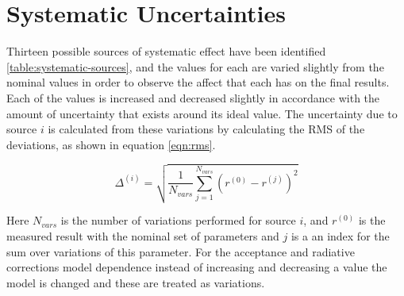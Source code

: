 \section{Systematic Uncertainties}
Thirteen possible sources of systematic effect have been identified \ref{table:systematic-sources}, and the values for each are varied slightly from the nominal values in order to observe the affect that each has on the final results.  Each of the values is increased and decreased slightly in accordance with the amount of uncertainty that exists around its ideal value.  The uncertainty due to source $i$ is calculated from these variations by calculating the RMS of the deviations, as shown in equation \ref{eqn:rms}.

\begin{equation}
	\Delta^{(i)} = \sqrt{\frac{1}{N_{vars}} \sum_{j = 1}^{N_{vars}} (r^{(0)} - r^{(j)})^2}
	\label{eqn:rms}
\end{equation}

Here $N_{vars}$ is the number of variations performed for source $i$, and $r^{(0)}$ is the measured result with the nominal set of parameters and $j$ is a an index for the sum over variations of this parameter.  For the acceptance and radiative corrections model dependence instead of increasing and decreasing a value the model is changed and these are treated as variations.  \\

